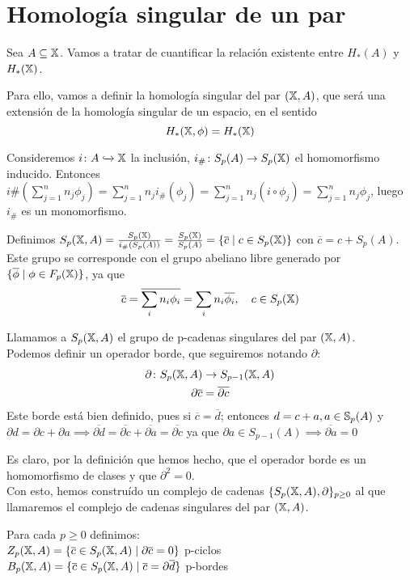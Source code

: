 \section{Homología singular de un par}

Sea $A \subseteq \X$. Vamos a tratar de cuantificar la relación existente entre $H_*(A)$ y $H_*(\X)$.

Para ello, vamos a definir la homología singular del par $(\X, A)$, que será una extensión de la homología singular de un espacio, en el sentido
\[H_*(\X, \phi) = H_*(\X)\]

Consideremos $i \colon A \xhookrightarrow{} \X$ la inclusión, $i_\# \colon S_p(A) \to \SX{p}$ el homomorfismo inducido.
Entonces $i\#(\sum\limits_{j = 1}^n n_j \phi_j) = \sum\limits_{j = 1}^n n_j i_\#(\phi_j) = \sum\limits_{j = 1}^n n_j (i \circ \phi_j) = \sum\limits_{j = 1}^n n_j \phi_j$,
luego $i_\#$ es un monomorfismo.

Definimos $S_p(\X, A) = \frac{\SX{p}}{i_\#(S_p(A))} = \frac{\SX{p}}{S_p(A)} = \{\overline{c} \mid c \in \SX{p} \}$ con $\overline{c} = c + S_p(A)$.
Este grupo se corresponde con el grupo abeliano libre generado por $\{\overline{\phi} \mid \phi \in \FX{p}\}$, ya que
\[\overline{c} = \overline{\sum_i n_i \phi_i} = \sum_i n_i \overline{\phi_i}, \quad c \in \SX{p} \]

Llamamos a $S_p(\X, A)$ el grupo de p-cadenas singulares del par $(\X, A)$. \\
Podemos definir un operador borde, que seguiremos notando $\partial$:
\begin{align*}
  \partial \colon S_p(\X, A) &\to S_{p-1}(\X, A) \\
  \partial \overline{c} &= \overline{\partial c}
\end{align*}
Este borde está bien definido, pues si $\overline{c} = \overline{d}$; entonces $d = c + a, a \in \S_p(A)$ y
$\partial d = \partial c + \partial a \implies \overline{\partial d} = \overline{\partial c} + \overline{\partial a} = \overline{\partial c}$ ya que
$\partial a \in S_{p-1}(A) \implies \overline{\partial a} = 0$

Es claro, por la definición que hemos hecho, que el operador borde es un homomorfismo de clases y que $\partial^2 = 0$. \\
Con esto, hemos construído un complejo de cadenas $\{S_p(\X, A), \partial\}_{p \geq 0}$ al que llamaremos el complejo de cadenas singulares del par $(\X, A)$.

Para cada $p \geq 0$ definimos: \\
$Z_p(\X, A) = \{\overline{c} \in S_p(\X, A) \mid \partial\overline{c} = 0\}$ p-ciclos \\
$B_p(\X, A) = \{\overline{c} \in S_p(\X, A) \mid \overline{c} = \partial\overline{d} \}$ p-bordes

